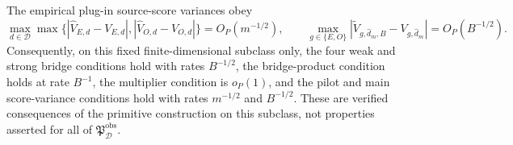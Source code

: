 The empirical plug-in source-score variances obey
\[
 \max_{d\in\mathcal D}\max\bigl\{
 |\widehat V_{E,d}-V_{E,d}|,
 |\widehat V_{O,d}-V_{O,d}|\bigr\}=O_P(m^{-1/2}),
 \qquad
 \max_{g\in\{E,O\}}
 |\widetilde V_{g,\widehat d_m,B}-V_{g,\widehat d_m}|
 =O_P(B^{-1/2}).                                             \tag{4}
\]
Consequently, on this fixed finite-dimensional subclass only, the four weak and strong bridge conditions hold with rates \(B^{-1/2}\), the bridge-product condition holds at rate \(B^{-1}\), the multiplier condition is \(o_P(1)\), and the pilot and main score-variance conditions hold with rates \(m^{-1/2}\) and \(B^{-1/2}\).  These are verified consequences of the primitive construction on this subclass, not properties asserted for all of \(\mathfrak P_{\mathcal D}^{\mathrm{obs}}\).